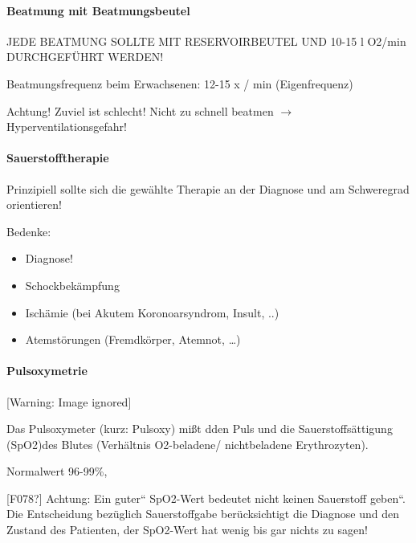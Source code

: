 \documentclass{article}
\begin{document}
\paragraph{Beatmung mit Beatmungsbeutel}
JEDE BEATMUNG SOLLTE MIT RESERVOIRBEUTEL UND 10-15 l O2/min
DURCHGEF\"UHRT WERDEN!

Beatmungsfrequenz beim Erwachsenen: 12-15 x / min (Eigenfrequenz)

Achtung! Zuviel ist schlecht! Nicht zu schnell beatmen ${\rightarrow}$
Hyperventilationsgefahr!

\paragraph{Sauerstofftherapie}
Prinzipiell sollte sich die gew\"ahlte Therapie an der Diagnose und am
Schweregrad orientieren!

Bedenke: 

\begin{itemize}
\item Diagnose!

\item Schockbek\"ampfung

\item Isch\"amie (bei Akutem Koronoarsyndrom, Insult, ..)

\item Atemst\"orungen (Fremdk\"orper, Atemnot, {\dots})

\end{itemize}
\paragraph[Pulsoxymetrie]{Pulsoxymetrie%
%
}
\begin{center}
 [Warning: Image ignored] %

\end{center}
Das Pulsoxymeter (kurz: Pulsoxy) mi{\ss}t dden Puls und die
Sauerstoffs\"attigung (SpO2)des Blutes (Verh\"altnis
O2-beladene/ nichtbeladene Erythrozyten). 

Normalwert 96-99\%, 

[F078?] Achtung: Ein {\quotedblbase}guter{\textquotedblleft}
SpO2{}-Wert bedeutet nicht {\quotedblbase}keinen Sauerstoff
geben{\textquotedblleft}. Die Entscheidung bez\"uglich Sauerstoffgabe
ber\"ucksichtigt die Diagnose und den Zustand des Patienten, der
SpO2{}-Wert hat wenig bis gar nichts zu sagen! 
\end{document}
